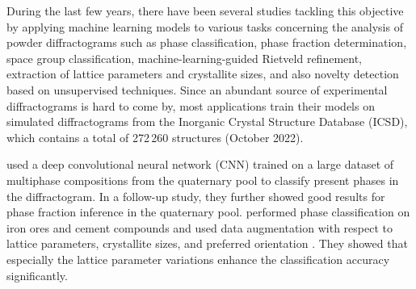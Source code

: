 During the last few years, there have been several studies tackling this
objective by applying machine learning models to various tasks concerning the
analysis of powder diffractograms such as phase
classification\supercite{leeDeeplearningTechniquePhase2020,maffettoneCrystallographyCompanionAgent2021,schuetzkeEnhancingDeeplearningTraining2021,szymanskiProbabilisticDeepLearning2021,wangRapidIdentificationXray2020},
phase fraction determination\supercite{leeDatadrivenXRDAnalysis2021}, space
group
classification\supercite{parkClassificationCrystalStructure2017,oviedoFastInterpretableClassification2019,zalogaCrystalSymmetryClassification2020,vecseiNeuralNetworkBased2019,suzukiSymmetryPredictionKnowledge2020,chakrabortyDeepCrystalStructure2022},
machine-learning-guided Rietveld
refinement\supercite{ozakiAutomatedCrystalStructure2020,fengMethodArtificialIntelligence2019},
extraction of lattice
parameters\supercite{dongDeepConvolutionalNeural2021,chitturiAutomatedPredictionLattice2021,chakrabortyDeepCrystalStructure2022,
habershonPowderDiffractionIndexing2004} and crystallite
sizes\supercite{dongDeepConvolutionalNeural2021,chakrabortyDeepCrystalStructure2022},
and also novelty detection based on unsupervised techniques\supercite{bankoDeepLearningVisualization2021}.
Since an abundant source of experimental diffractograms is hard to come by, most
applications train their models on simulated diffractograms from the Inorganic
Crystal Structure Database (ICSD)\supercite{bergerhoff1987}, which contains a total of 272\,260 structures (October 2022).

\citeauthor{leeDeeplearningTechniquePhase2020} used a deep convolutional neural
network (CNN) trained on a large dataset of multiphase compositions from the
quaternary  pool to classify present phases in the
diffractogram\supercite{leeDeeplearningTechniquePhase2020}. In a follow-up
study, they further showed good results for phase fraction inference in the
quaternary  pool\supercite{leeDatadrivenXRDAnalysis2021}.
\citeauthor{schuetzkeEnhancingDeeplearningTraining2021} performed phase
classification on iron ores and cement compounds and used data augmentation with
respect to lattice parameters, crystallite sizes, and preferred orientation
\supercite{schuetzkeEnhancingDeeplearningTraining2021}. They showed that
especially the lattice parameter variations enhance the classification accuracy
significantly.


